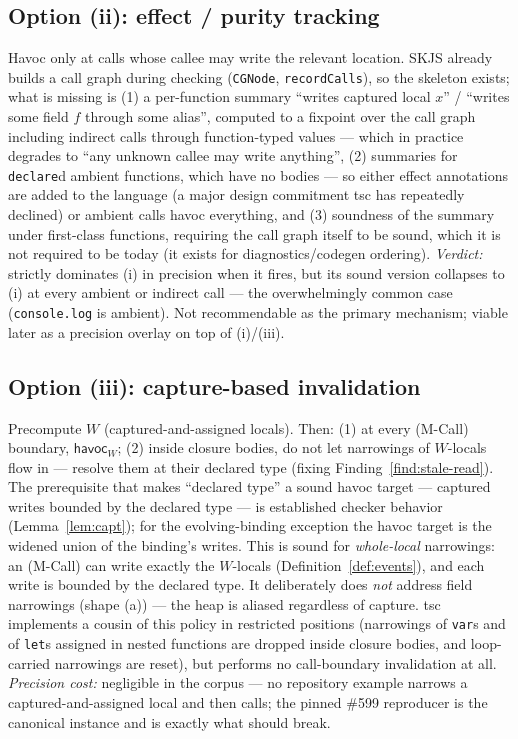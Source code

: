 \documentclass[11pt]{article}
\newcommand{\havoc}{\mathsf{havoc}}
\begin{document}
\subsection{Option (ii): effect / purity tracking}
Havoc only at calls whose callee may write the relevant location. SKJS
already builds a call graph during checking (\texttt{CGNode},
\texttt{recordCalls}), so the skeleton exists; what is missing is
(1) a per-function summary ``writes captured local $x$'' /
``writes some field $f$ through some alias'', computed to a fixpoint over
the call graph including indirect calls through function-typed values —
which in practice degrades to ``any unknown callee may write anything'',
(2) summaries for \texttt{declare}d ambient functions, which have no
bodies — so either effect annotations are added to the language
(a major design commitment tsc has repeatedly declined) or ambient calls
havoc everything, and (3) soundness of the summary under first-class
functions, requiring the call graph itself to be sound, which it is not
required to be today (it exists for diagnostics/codegen ordering).
\emph{Verdict:} strictly dominates (i) in precision when it fires, but
its sound version collapses to (i) at every ambient or indirect call —
the overwhelmingly common case (\texttt{console.log} is ambient). Not
recommendable as the primary mechanism; viable later as a precision
overlay on top of (i)/(iii).

\subsection{Option (iii): capture-based invalidation}
Precompute $W$ (captured-and-assigned locals). Then: (1) at every
(M-Call) boundary, $\havoc_W$; (2) inside closure bodies, do not let
narrowings of $W$-locals flow in — resolve them at their declared type
(fixing Finding~\ref{find:stale-read}). The prerequisite that makes
``declared type'' a sound havoc target — captured writes bounded by the
declared type — is established checker behavior (Lemma~\ref{lem:capt});
for the evolving-binding exception the havoc target is the widened union
of the binding's writes. This is sound for \emph{whole-local}
narrowings: an (M-Call) can write exactly the $W$-locals
(Definition~\ref{def:events}), and each write is bounded by the declared
type. It deliberately does \emph{not} address field
narrowings (shape (a)) — the heap is aliased regardless of capture. tsc
implements a cousin of this policy in restricted positions (narrowings of
\texttt{var}s and of \texttt{let}s assigned in nested functions are
dropped inside closure bodies, and loop-carried narrowings are reset),
but performs no call-boundary invalidation at all.
\emph{Precision cost:} negligible in the corpus — no repository example
narrows a captured-and-assigned local and then calls; the pinned
\#599 reproducer is the canonical instance and is exactly what should
break.
\end{document}

